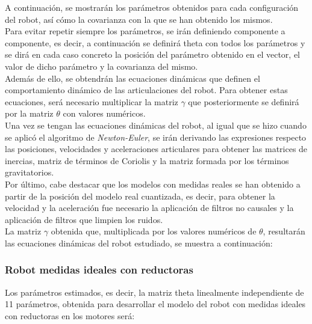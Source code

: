 A continuación, se mostrarán los parámetros obtenidos para cada configuración del robot, así cómo la covarianza con la que se han obtenido los mismos.\\
Para evitar repetir siempre los parámetros, se irán definiendo componente a componente, es decir, a continuación se definirá theta con todos los parámetros y se dirá en cada caso concreto la posición del parámetro obtenido en el vector, el valor de dicho parámetro y la covarianza del mismo. \\
Además de ello, se obtendrán las ecuaciones dinámicas que definen el comportamiento dinámico de las articulaciones del robot. Para obtener estas ecuaciones, será necesario multiplicar la matriz $\gamma$ que posteriormente se definirá por la matriz $\theta$ con valores numéricos. \\

Una vez se tengan las ecuaciones dinámicas del robot, al igual que se hizo cuando se aplicó el algoritmo de \textit{Newton-Euler}, se irán derivando las expresiones respecto las posiciones, velocidades y aceleraciones articulares para obtener las matrices de inercias, matriz de términos de Coriolis y la matriz formada por los términos gravitatorios.\\

Por último, cabe destacar que los modelos con medidas reales se han obtenido a partir de la posición del modelo real cuantizada, es decir, para obtener la velocidad y la aceleración fue necesario la aplicación de filtros no causales y la aplicación de filtros que limpien los ruidos.\\

La matriz $\gamma$ obtenida que, multiplicada por los valores numéricos de $\theta$, resultarán las ecuaciones dinámicas del robot estudiado, se muestra a continuación:
\newpage
\subsubsection{Robot medidas ideales con reductoras}

Los parámetros estimados, es decir, la matriz theta linealmente independiente de 11 parámetros, obtenida para desarrollar el modelo del robot con medidas ideales con reductoras en los motores será:

